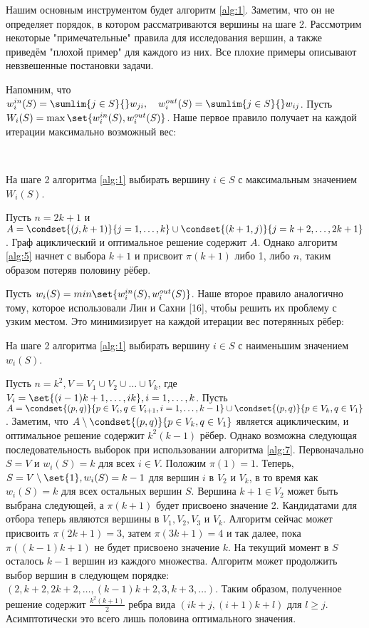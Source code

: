 \documentclass[a4paper, 12pt, oneside]{extarticle}  %
\begin{document}
Нашим основным инструментом будет алгоритм \ref{alg:1}. Заметим, что он не определяет порядок, в котором рассматриваются вершины на шаге 2. Рассмотрим некоторые "примечательные" правила для исследования вершин, а также приведём "плохой пример" для каждого из них. Все плохие примеры описывают невзвешенные постановки задачи.

Напомним, что $w_i^{in}(S) = \sumlim{j\in S}{}w_{ji},\quad w_i^{out}(S) = \sumlim{j\in S}{}w_{ij}$. Пусть $W_i(S) = \max\set{w_i^{in}(S), w_i^{out}(S)}$. Наше первое правило получает на каждой итерации максимально возможный вес:

\begin{algo}\label{alg:5}\ \par
  На шаге 2 алгоритма \ref{alg:1} выбирать вершину $i\in S$ с максимальным значением $W_i(S)$.
\end{algo}

\begin{example}
  Пусть $n=2k+1$ и $A=\condset{(j,k+1)}{j = 1,\ldots,k} \cup \condset{(k+1,j)}{j=k+2,\ldots,2k+1}$. Граф ациклический и оптимальное решение содержит $A$. Однако алгоритм \ref{alg:5} начнет с выбора $k+1$ и присвоит $\pi(k+1)$ либо 1, либо $n$, таким образом потеряв половину рёбер.
\end{example}

Пусть $w_i(S) = min\set{w_i^{in}(S), w_i^{out}(S)}$. Наше второе правило аналогично тому, которое использовали Лин и Сахни [16], чтобы решить их проблему с узким местом. Это минимизирует на каждой итерации вес потерянных рёбер:

\begin{algo}\label{alg:7}
  На шаге 2 алгоритма \ref{alg:1} выбирать вершину $i\in S$ с наименьшим значением $w_i(S)$.
\end{algo}

\begin{example}\label{examp:8}
  Пусть $n=k^2, V=V_1 \cup V_2 \cup \ldots \cup V_k$, где $V_i = \set{(i-1)k + 1,\ldots,ik}, i=1,\ldots,k$. Пусть $A = \condset{(p,q)}{p \in V_i, q \in V_{i+1}, i=1,\ldots,k-1} \cup \condset{(p,q)}{p \in V_k, q \in V_1}$. Заметим, что $A \setminus \condset{(p, q)}{p \in V_k, q \in V_1}$ является ациклическим, и
  оптимальное решение содержит $k^2(k-1)$ рёбер. Однако возможна следующая последовательность выборок при использовании алгоритма \ref{alg:7}. Первоначально $S=V$ и $w_i(S)=k$ для всех $i \in V$. Положим $\pi(1)=1$. Теперь, $S=V\setminus\set{1}, w_i(S) = k-1$ для вершин $i$ в $V_2$ и $V_k$, в то время как $w_i(S)=k$ для всех остальных вершин $S$. Вершина $k+1 \in V_2$ может быть выбрана следующей, а $\pi(k+1)$ будет присвоено значение 2. Кандидатами для отбора теперь являются вершины в $V_1, V_2, V_3$ и $V_k$. Алгоритм сейчас может присвоить $\pi(2k + 1) = 3$, затем $\pi(3k + 1) = 4$ и так далее, пока $\pi((k-1)k + 1)$ не будет присвоено значение $k$. На текущий момент в $S$ осталось $k-1$ вершин из каждого множества. Алгоритм может продолжить выбор вершин в следующем порядке: $(2, k+2, 2k+2,\ldots, (k-1)k + 2, 3, k+3, \ldots)$. Таким образом, полученное решение содержит $\frac{k^2(k + 1)}{2}$ ребра вида
  $(ik + j, (i + 1)k + l)$ для $l \ge j$. Асимптотически это всего лишь половина оптимального значения.
\end{example}
\end{document}
